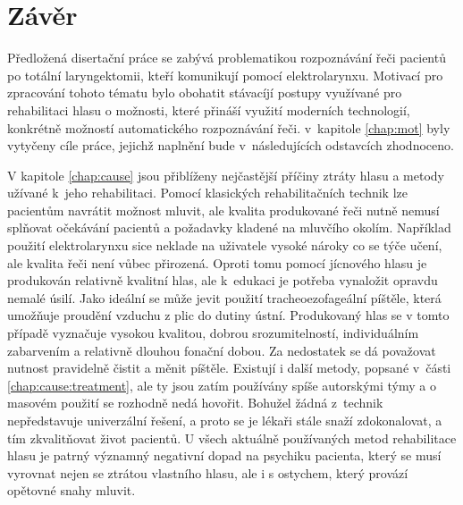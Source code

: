 \chapter*{Závěr}
\label{chap:conclusion}

Předložená disertační práce se zabývá problematikou rozpoznávání řeči pacientů po totální laryngektomii, kteří komunikují pomocí elektrolarynxu. Motivací pro zpracování tohoto tématu bylo obohatit stávacíjí postupy využívané pro rehabilitaci hlasu o možnosti, které přináší využití moderních technologií, konkrétně možností automatického rozpoznávání řeči. v~kapitole \ref{chap:mot} byly vytyčeny cíle práce, jejichž naplnění bude v~následujících odstavcích zhodnoceno.

V kapitole \ref{chap:cause} jsou přiblíženy nejčastější příčiny ztráty hlasu a metody užívané k~jeho rehabilitaci.
Pomocí klasických rehabilitačních technik lze pacientům navrátit možnost mluvit, ale kvalita produkované řeči nutně nemusí splňovat očekávání pacientů  a požadavky kladené na mluvčího okolím. Například použití
elektrolarynxu sice neklade na uživatele vysoké nároky co se týče učení, ale
kvalita řeči není vůbec přirozená. Oproti tomu pomocí jícnového hlasu je
produkován relativně kvalitní hlas, ale k~edukaci je potřeba vynaložit opravdu
nemalé úsilí. Jako ideální se může jevit použití tracheoezofageální píštěle,
která umožňuje proudění vzduchu z plic do dutiny ústní. Produkovaný hlas se v
tomto případě vyznačuje vysokou kvalitou, dobrou srozumitelností,
individuálním zabarvením a relativně dlouhou fonační dobou. Za nedostatek se
dá považovat nutnost pravidelně čistit a měnit píštěle. Existují i další
metody, popsané v~části \ref{chap:cause:treatment}, ale ty jsou zatím používány
spíše autorskými týmy a o masovém použití se rozhodně nedá hovořit. Bohužel
žádná z~technik nepředstavuje univerzální řešení, a proto se je lékaři
stále snaží zdokonalovat, a tím zkvalitňovat život pacientů. U všech aktuálně používaných metod rehabilitace hlasu
je patrný významný negativní dopad na psychiku pacienta, který se musí vyrovnat nejen se ztrátou vlastního hlasu, ale i s ostychem, který provází opětovné snahy mluvit.


